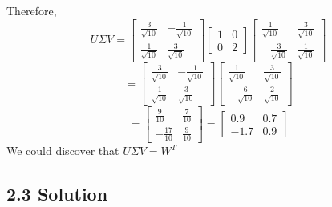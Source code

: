 \documentclass{article}
\begin{document}
Therefore,
\[
U \Sigma V = \begin{bmatrix} \frac{3}{\sqrt{10}} & -\frac{1}{\sqrt{10}} \\ \frac{1}{\sqrt{10}} & \frac{3}{\sqrt{10}} \end{bmatrix} \begin{bmatrix} 1 & 0 \\ 0 & 2 \end{bmatrix} \begin{bmatrix} \frac{1}{\sqrt{10}} & \frac{3}{\sqrt{10}} \\ -\frac{3}{\sqrt{10}} & \frac{1}{\sqrt{10}} \end{bmatrix}
\]
\[
= \begin{bmatrix} \frac{3}{\sqrt{10}} & -\frac{1}{\sqrt{10}} \\ \frac{1}{\sqrt{10}} & \frac{3}{\sqrt{10}} \end{bmatrix} \begin{bmatrix} \frac{1}{\sqrt{10}} & \frac{3}{\sqrt{10}} \\ -\frac{6}{\sqrt{10}} & \frac{2}{\sqrt{10}} \end{bmatrix}
\]
\[
= \begin{bmatrix} \frac{9}{10} & \frac{7}{10} \\ -\frac{17}{10} & \frac{9}{10} \end{bmatrix} = \begin{bmatrix} 0.9 & 0.7 \\ -1.7 & 0.9 \end{bmatrix}
\]
We could discover that $U \Sigma V = W^T$

\subsection*{2.3 Solution}
\end{document}
